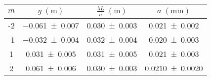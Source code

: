 \begin{tabular}{cc|cc}
\toprule
$m$ &    $y \; (\si{\m})$ & $\frac{\lambda L}{a} \; (\si{\m})$ &    $a \; (\si{\mm})$ \\
\midrule
 -2 & \num{-0.061+-0.007} &                 \num{0.030+-0.003} &   \num{0.021+-0.002} \\
 -1 & \num{-0.032+-0.004} &                 \num{0.032+-0.004} &   \num{0.020+-0.003} \\
  1 &  \num{0.031+-0.005} &                 \num{0.031+-0.005} &   \num{0.021+-0.003} \\
  2 &  \num{0.061+-0.006} &                 \num{0.030+-0.003} & \num{0.0210+-0.0020} \\
\bottomrule
\end{tabular}
